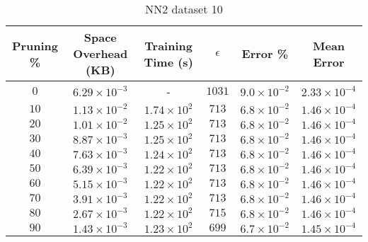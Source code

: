 \begin{adjustwidth}{0cm}{}
\begin{table}
\caption{NN2 dataset 10}\label{pr210}
\begin{tabular}{cccccc}
\hline
\toprule
Pruning \% & Space Overhead (KB) & Training Time (s) & $\epsilon$ & Error \% & Mean Error\\
\midrule
$0$ & $6.29 \times 10^{-3}$ & - & $1031$ & $9.0 \times 10^{-2}$ & $2.33 \times 10^{-4}$\\
$10$ & $1.13 \times 10^{-2}$ & $1.74 \times 10^{2}$ & $713$ & $6.8 \times 10^{-2}$ & $1.46 \times 10^{-4}$\\
$20$ & $1.01 \times 10^{-2}$ & $1.25 \times 10^{2}$ & $713$ & $6.8 \times 10^{-2}$ & $1.46 \times 10^{-4}$\\
$30$ & $8.87 \times 10^{-3}$ & $1.25 \times 10^{2}$ & $713$ & $6.8 \times 10^{-2}$ & $1.46 \times 10^{-4}$\\
$40$ & $7.63 \times 10^{-3}$ & $1.24 \times 10^{2}$ & $713$ & $6.8 \times 10^{-2}$ & $1.46 \times 10^{-4}$\\
$50$ & $6.39 \times 10^{-3}$ & $1.22 \times 10^{2}$ & $713$ & $6.8 \times 10^{-2}$ & $1.46 \times 10^{-4}$\\
$60$ & $5.15 \times 10^{-3}$ & $1.22 \times 10^{2}$ & $713$ & $6.8 \times 10^{-2}$ & $1.46 \times 10^{-4}$\\
$70$ & $3.91 \times 10^{-3}$ & $1.22 \times 10^{2}$ & $713$ & $6.8 \times 10^{-2}$ & $1.46 \times 10^{-4}$\\
$80$ & $2.67 \times 10^{-3}$ & $1.22 \times 10^{2}$ & $715$ & $6.8 \times 10^{-2}$ & $1.46 \times 10^{-4}$\\
$90$ & $1.43 \times 10^{-3}$ & $1.23 \times 10^{2}$ & $699$ & $6.7 \times 10^{-2}$ & $1.45 \times 10^{-4}$\\
\bottomrule
\end{tabular}
\end{table}
\end{adjustwidth}

\null\par\null

